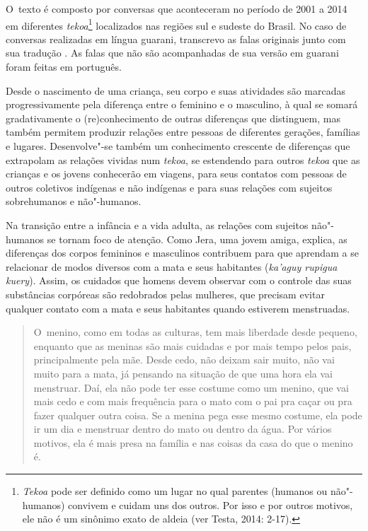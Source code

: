 O~texto é composto por conversas que aconteceram no período de 2001 a
2014 em diferentes \emph{tekoa}\footnote{\emph{Tekoa} pode ser definido como um lugar
no qual parentes (humanos ou não"-humanos) convivem e cuidam uns dos
outros. Por isso e por outros motivos, ele não é um sinônimo exato de
aldeia (ver Testa, 2014: 2-17).} localizados nas regiões sul e
sudeste do Brasil. No caso de conversas realizadas em língua guarani,
transcrevo as falas originais junto com sua tradução\footnotemark
{}. As falas que não são acompanhadas
de sua versão em guarani foram feitas em português.

Desde o nascimento de uma criança, seu corpo e suas atividades são
marcadas progressivamente pela diferença entre o feminino e o
masculino, à qual se somará gradativamente o (re)conhecimento de outras
diferenças que distinguem, mas também permitem produzir relações entre
pessoas de diferentes gerações, famílias e lugares. Desenvolve"-se
também um conhecimento crescente de diferenças que extrapolam as
relações vividas num \emph{tekoa}, se estendendo para outros \emph{tekoa} que as
crianças e os jovens conhecerão em viagens, para seus contatos com
pessoas de outros coletivos indígenas e não indígenas e para suas
relações com sujeitos sobrehumanos e não"-humanos. 

Na transição entre a infância e a vida adulta, as relações com sujeitos
não"-humanos se tornam foco de atenção. Como Jera, uma jovem amiga,
explica, as diferenças dos corpos femininos e masculinos contribuem
para que aprendam a se relacionar de modos diversos com a mata e seus
habitantes (\emph{ka’aguy rupigua kuery}). Assim, os cuidados que homens devem
observar com o controle das suas substâncias corpóreas são redobrados
pelas mulheres, que precisam evitar qualquer contato com a mata e seus
habitantes quando estiverem menstruadas. 

\begin{quote}
\noindent
O~menino, como em todas as culturas, tem mais liberdade desde pequeno,
enquanto que as meninas são mais cuidadas e por mais tempo pelos pais,
principalmente pela mãe. Desde cedo, não deixam sair muito, não vai
muito para a mata, já pensando na situação de que uma hora ela vai
menstruar. Daí, ela não pode ter esse costume como um menino, que vai
mais cedo e com mais frequência para o mato com o pai pra caçar ou pra
fazer qualquer outra coisa. Se a menina pega esse mesmo costume, ela
pode ir um dia e menstruar dentro do mato ou dentro da água. Por vários
motivos, ela é mais presa na família e nas coisas da casa do que o
menino é.
\end{quote}

